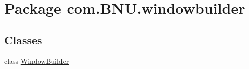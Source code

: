 \hypertarget{namespacecom_1_1_b_n_u_1_1windowbuilder}{}\section{Package com.\+B\+N\+U.\+windowbuilder}
\label{namespacecom_1_1_b_n_u_1_1windowbuilder}
\subsection*{Classes}
\begin{DoxyCompactItemize}
\item 
class \mbox{\hyperlink{classcom_1_1_b_n_u_1_1windowbuilder_1_1_window_builder}{Window\+Builder}}
\end{DoxyCompactItemize}
